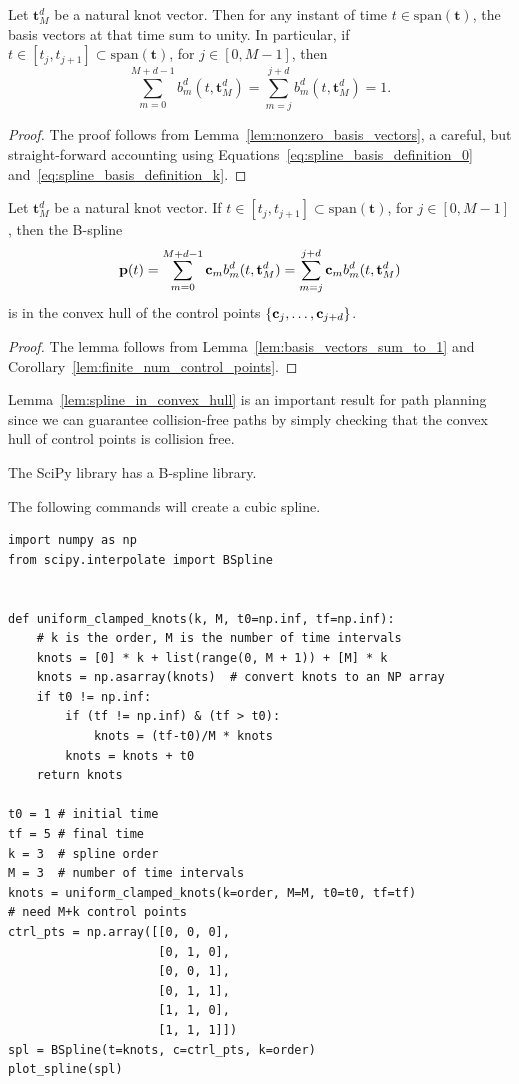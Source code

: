 \begin{lemma} \label{lem:basis_vectors_sum_to_1}
	Let $\mathbf{t}_M^d$ be a natural knot vector.  Then for any instant of time $t\in\text{span}(\mathbf{t})$, the basis vectors at that time sum to unity.  In particular, if $t\in[t_j, t_{j+1}]\subset\text{span}(\mathbf{t})$, for $j\in[0,M-1]$, then
	\[
	\sum_{m=0}^{M+d-1} b_m^d(t, \mathbf{t}_M^d) =
	\sum_{m=j}^{j+d} b_m^d(t, \mathbf{t}_M^d) = 1.
	\]
\end{lemma}
\begin{proof}  The proof follows from Lemma~\ref{lem:nonzero_basis_vectors}, a careful, but straight-forward accounting using Equations~\eqref{eq:spline_basis_definition_0} and~\eqref{eq:spline_basis_definition_k}.	
\end{proof}


\begin{lemma}\label{lem:spline_in_convex_hull}
	Let $\mathbf{t}_M^d$ be a natural knot vector. 
	If $t\in[t_j, t_{j+1}]\subset\text{span}(\mathbf{t})$, for $j\in[0,M-1]$, then the B-spline
	\[
	\mathbf{p}(t) = \sum_{m=0}^{M+d-1} \mathbf{c}_m b_m^d(t, \mathbf{t}_M^d) = \sum_{m=j}^{j+d} \mathbf{c}_m b_m^d(t,  \mathbf{t}_M^d)
	\]
	is in the convex hull of the control points $\{\mathbf{c}_j, \dots, \mathbf{c}_{j+d}\}$.
\end{lemma}
\begin{proof}
	The lemma follows from Lemma~\ref{lem:basis_vectors_sum_to_1} and Corollary~\ref{lem:finite_num_control_points}.
\end{proof}
Lemma~\ref{lem:spline_in_convex_hull} is an important result for path planning since we can guarantee collision-free paths by simply checking that the convex hull of control points is collision free.

\par{}
The SciPy library has a B-spline library.  

The following commands will create a cubic spline.
\begin{lstlisting}
import numpy as np
from scipy.interpolate import BSpline
	
	
def uniform_clamped_knots(k, M, t0=np.inf, tf=np.inf):
    # k is the order, M is the number of time intervals
    knots = [0] * k + list(range(0, M + 1)) + [M] * k
    knots = np.asarray(knots)  # convert knots to an NP array
    if t0 != np.inf:
        if (tf != np.inf) & (tf > t0):
            knots = (tf-t0)/M * knots
        knots = knots + t0
    return knots	

t0 = 1 # initial time
tf = 5 # final time
k = 3  # spline order
M = 3  # number of time intervals
knots = uniform_clamped_knots(k=order, M=M, t0=t0, tf=tf)
# need M+k control points
ctrl_pts = np.array([[0, 0, 0],  
                     [0, 1, 0],
                     [0, 0, 1],
                     [0, 1, 1],
                     [1, 1, 0],
                     [1, 1, 1]])
spl = BSpline(t=knots, c=ctrl_pts, k=order)
plot_spline(spl)
\end{lstlisting}

